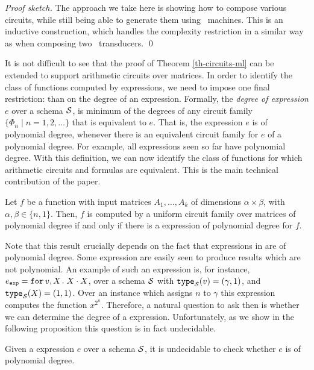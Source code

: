 \textit{Proof sketch.} The approach we take here is showing how to compose various circuits, while still being able to generate them using \logspace\ machines. This is an inductive construction, which handles the complexity restriction in a similar way as when composing two \logspace\ transducers. \qed

It is not difficult to see that the proof of Theorem \ref{th-circuits-ml} can be extended to support arithmetic circuits over matrices. In order to identify the class of functions computed by \langfor expressions, we need to impose one final restriction: than on the degree of an expression. Formally, the \textit{degree of \langfor expression $e$} over a schema $\mathcal{S}$, is minimum of the degrees of any circuit family  $\{\Phi_n\mid n=1,2,\ldots\}$ that is equivalent to $e$. That is, the expression $e$ is of polynomial degree, whenever there is an equivalent circuit family for $e$ of a polynomial degree.  
For example, all \langfor expressions seen so far have polynomial degree.
With this definition, we can now identify the class of functions for which arithmetic circuits and \langfor formulas are equivalent. This is the main technical contribution of the paper. 

\begin{corollary}
\label{th-equivalence}
Let $f$ be a function with input matrices $A_1,\ldots ,A_k$ of dimensions $\alpha\times \beta$, with $\alpha,\beta \in \{n,1\}$. Then, $f$ is computed by a uniform circuit family over matrices of polynomial degree if and only if there is a \langfor expression of polynomial degree for $f$. 
\end{corollary}

Note that this result crucially depends on the fact that expressions in \langfor are of polynomial degree. Some \langfor expression are easily seen to produce results which are not polynomial. An example of such an expression is, for instance, $e_{\texttt{exp}} = \texttt{for}\, v,X \texttt{.}\, X\cdot X$, over a schema $\mathcal{S}$ with $\texttt{type}_{\mathcal{S}}(v)= (\gamma,1)$, and $\texttt{type}_{\mathcal{S}}(X)=(1,1)$. Over an instance which assigns $n$ to $\gamma$ this expression computes the function $x^{2^n}$. Therefore, a natural question to ask then is whether we can determine the degree of a \langfor expression. Unfortunately, as we show in the following proposition this question is in fact undecidable.

\begin{proposition}
\label{prop-undec}
Given a \langfor expression $e$ over a schema $\mathcal{S}$, it is undecidable to check whether $e$ is of polynomial degree.
\end{proposition}


